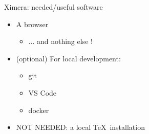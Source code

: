 \begin{frame}{Ximera: needed/useful software}
  \begin{itemize}[<+->]
    \item A browser
    \begin{itemize}[<+->]
      \item ... and nothing else !
    \end{itemize}
    \item (optional) For local development:
    \begin{itemize}[<+->]
      \item git
      \item VS Code
      \item docker
    \end{itemize}
    \item NOT NEEDED: a local \TeX\  installation
  \end{itemize}
\end{frame}


